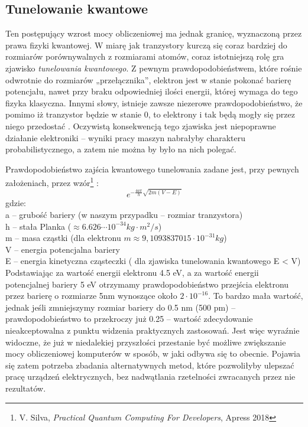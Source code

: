 \documentclass[12pt,a4paper,twoside,openany]{book}
\begin{document}
\subsection{Tunelowanie kwantowe}

Ten postępujący wzrost mocy obliczeniowej ma jednak granicę, wyznaczoną przez prawa fizyki kwantowej. W miarę jak tranzystory kurczą się coraz bardziej do rozmiarów porównywalnych z rozmiarami atomów, coraz istotniejszą rolę gra zjawisko \textit{tunelowania kwantowego}. Z pewnym prawdopodobieństwem, które rośnie odwrotnie do rozmiarów „przełącznika”, elektron jest w stanie pokonać barierę potencjału, nawet przy braku odpowiedniej ilości energii, której wymaga do tego fizyka klasyczna. Innymi słowy, istnieje zawsze niezerowe prawdopodobieństwo, że pomimo iż tranzystor będzie w stanie 0, to elektrony i tak będą mogły się przez niego przedostać . Oczywistą konsekwencją tego zjawiska jest niepoprawne działanie elektroniki – wyniki pracy maszyn nabrałyby charakteru probabilistycznego, a zatem nie można by było na nich polegać.
	
Prawdopodobieństwo zajścia kwantowego tunelowania zadane jest, przy pewnych założeniach, przez wzór\footnote{V. Silva, \textit{Practical Quantum Computing For Developers}, Apress 2018} :
\begin{equation}
e^{-\frac{4a\pi}{h}\sqrt{2m(V - E)}}
\end{equation}
gdzie: \\
\indent a – grubość bariery (w naszym przypadku – rozmiar tranzystora) \\
\indent h – stała Planka ($ \approx 6.626 \cdots 10^{-34}  kg  \cdot m^2 / s$) \\
\indent m – masa cząstki (dla elektronu $m \approx 9,109 3837015 \cdot 10^{-31} kg$) \\
\indent V – energia potencjalna bariery \\ 
\indent E – energia kinetyczna cząsteczki ( dla zjawiska tunelowania kwantowego E < V) \\

Podstawiając za wartość energii elektronu 4.5 eV, a za wartość energii potencjalnej bariery 5 eV otrzymamy prawdopodobieństwo przejścia elektronu przez barierę o rozmiarze 5nm wynoszące około $ 2 \cdot 10^{-16} $. To bardzo mała wartość, jednak jeśli zmniejszymy rozmiar bariery do 0.5 nm (500 pm) – prawdopodobieństwo to przekroczy już 0.25 – wartość zdecydowanie nieakceptowalna z punktu widzenia praktycznych zastosowań. Jest więc wyraźnie widoczne, że już w niedalekiej przyszłości przestanie być możliwe zwiększanie mocy obliczeniowej komputerów w sposób, w jaki odbywa się to obecnie. Pojawia się zatem potrzeba zbadania alternatywnych metod, które pozwoliłyby ulepszać pracę urządzeń elektrycznych, bez nadwątlania rzetelności zwracanych przez nie rezultatów.
\end{document}
